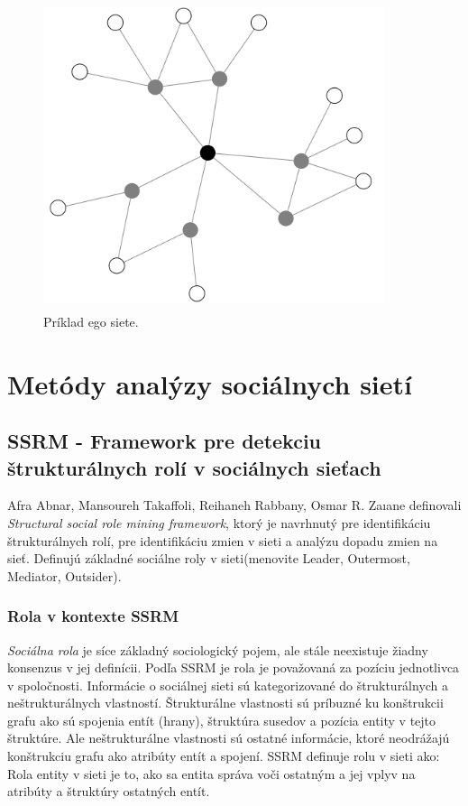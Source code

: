 \documentclass[slovak,master,public,dept460,male,cpdeclaration,oneside]{diploma}
\begin{document}
\begin{figure}[H]
\centering
\includegraphics[width=10cm, height=9cm]{figures/egonet}
\caption{Príklad ego siete.}
\end{figure}


\section{Metódy analýzy sociálnych sietí}

\subsection{SSRM - Framework pre detekciu štrukturálnych rolí v sociálnych sieťach}

Afra Abnar, Mansoureh Takaffoli, Reihaneh Rabbany, Osmar R. Zaıane \cite{9} definovali \textit{Structural social role mining framework}, ktorý je navrhnutý pre identifikáciu štrukturálnych rolí, pre identifikáciu zmien v sieti a analýzu dopadu zmien na sieť. Definujú základné sociálne roly v sieti(menovite Leader, Outermost, Mediator, Outsider). 

\subsubsection{Rola v kontexte SSRM}
\textit{Sociálna rola} je síce základný sociologický pojem, ale stále neexistuje žiadny konsenzus v jej definícii. Podľa SSRM je rola je považovaná za pozíciu jednotlivca v spoločnosti.
 Informácie o sociálnej sieti sú kategorizované do štrukturálnych a neštrukturálnych vlastností. Štrukturálne vlastnosti sú príbuzné ku konštrukcii grafu ako sú spojenia entít (hrany), štruktúra susedov a pozícia entity v tejto štruktúre. Ale neštrukturálne vlastnosti sú ostatné informácie, ktoré neodrážajú konštrukciu grafu ako atribúty entít a spojení. SSRM definuje rolu v sieti ako: Rola entity v sieti je to, ako sa entita správa voči ostatným a jej vplyv na atribúty a štruktúry ostatných entít.
\end{document}
